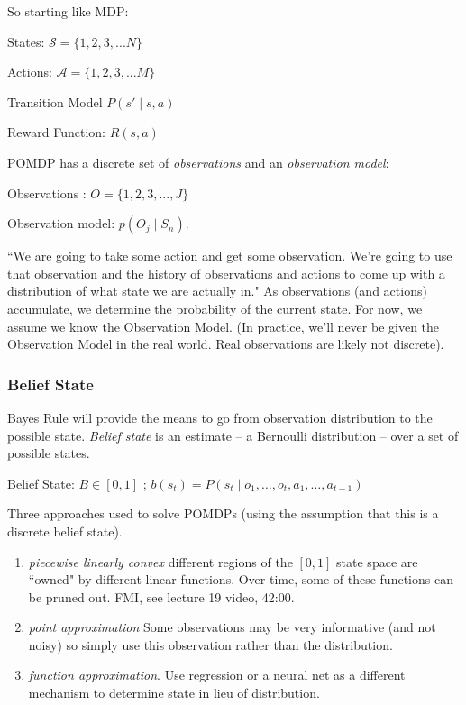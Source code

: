 \documentclass[11pt, oneside]{article}   	%
\begin{document}
So starting like MDP:

States: $\mathcal{S} = \{1,2,3,...N\}$

Actions: $\mathcal{A} = \{1,2,3,...M\}$ 

Transition Model $P(s'\mid s,a)$

Reward Function: $R(s,a)$

POMDP has a discrete set of \emph{observations} and an \emph{observation model}:

Observations : $O = \{1, 2, 3, ... , J\}$

Observation model: $p(O_j \mid S_n)$.

``We are going to take some action and get some observation. We're going to use that observation and the history of observations and actions to come up with a distribution of what state we are actually in." As observations (and actions) accumulate, we determine the probability of the current state. For now, we assume we know the Observation Model. (In practice, we'll never be given the Observation Model in the real world. Real observations are likely not discrete).

\subsubsection{Belief State}

Bayes Rule will provide the means to go from observation distribution to the possible state. \emph{Belief state} is an estimate -- a Bernoulli distribution -- over a set of possible states.

Belief State: $B \in [0, 1]$ ; $b(s_t) = P(s_t \mid o_1, \hdots , o_t,a_1, \hdots , a_{t-1})$

Three approaches used to solve POMDPs (using the assumption that this is a discrete belief state). 
\begin{enumerate}
	\item \emph{piecewise linearly convex} different regions of the $[0,1]$ state space are ``owned" by different linear functions.  Over time, some of these functions can be pruned out. FMI, see lecture 19 video, 42:00. 
	\item \emph{point approximation} Some observations may be very informative (and not noisy) so simply use this observation rather than the distribution.
	\item \emph{function approximation}. Use regression or a neural net as a different mechanism to determine state in lieu of distribution.
\end{enumerate}
\end{document}

